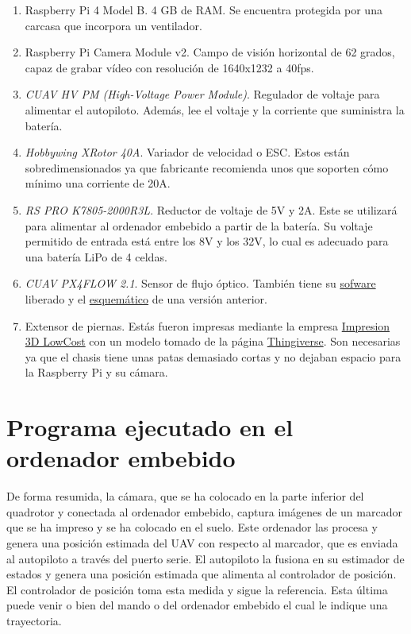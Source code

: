\begin{enumerate}
\item Raspberry Pi 4 Model B. 4 GB de RAM. Se encuentra protegida por una carcasa que incorpora un ventilador. 
\item Raspberry Pi Camera Module v2. Campo de visión horizontal de 62 grados, capaz de grabar vídeo con resolución de 1640x1232 a 40fps.
\item \textit{CUAV HV PM (High-Voltage Power Module)}. Regulador de voltaje para alimentar el autopiloto. Además, lee el voltaje y la corriente que suministra la batería. 
\item \textit{Hobbywing XRotor 40A}. Variador de velocidad o ESC. Estos están sobredimensionados ya que fabricante recomienda unos que soporten cómo mínimo una corriente de 20A.
\item \textit{RS PRO K7805-2000R3L}. Reductor de voltaje de 5V y 2A. Este se utilizará para alimentar al ordenador embebido a partir de la batería. Su voltaje permitido de entrada está entre los 8V y los 32V, lo cual es adecuado para una batería LiPo de 4 celdas. 
\item \textit{CUAV PX4FLOW 2.1}. Sensor de flujo óptico. También tiene su \href{https://github.com/PX4/PX4-Flow}{sofware} liberado y el \href{https://github.com/pixhawk/Hardware/tree/master/FLOWv1}{esquemático} de una versión anterior.
\item Extensor de piernas. Estás fueron impresas mediante la empresa \href{https://impresion3dlowcost.es/}{Impresion 3D LowCost} con un modelo tomado de la página \href{https://www.thingiverse.com/thing:915639}{Thingiverse}. Son necesarias ya que el chasis tiene unas patas demasiado cortas y no dejaban espacio para la Raspberry Pi y su cámara. 
\end{enumerate}



\section{Programa ejecutado en el ordenador embebido}
De forma resumida, la cámara, que se ha colocado en la parte inferior del quadrotor y conectada al ordenador embebido, captura imágenes de un marcador que se ha impreso y se ha colocado en el suelo. Este ordenador las procesa y genera una posición estimada del UAV con respecto al marcador, que es enviada al autopiloto a través del puerto serie. El autopiloto la fusiona en su estimador de estados y genera una posición estimada que alimenta al controlador de posición.  El controlador de posición toma esta medida y sigue la referencia. Esta última puede venir o bien del mando o del ordenador embebido el cual le indique una trayectoria.


